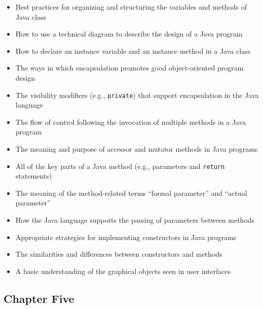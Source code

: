 \documentclass[11pt]{article}
\begin{document}
\begin{itemize}

  \itemsep 0in

  \item Best practices for organizing and structuring the variables and methods
    of Java class

  \item How to use a technical diagram to describe the design of a Java program

  \item How to declare an instance variable and an instance method in a Java
    class

  \item The ways in which encapsulation promotes good object-oriented program design

  \item The visibility modifiers (e.g., {\tt private}) that support
    encapsulation in the Java language

  \item The flow of control following the invocation of multiple methods in a
    Java program

  \item The meaning and purpose of accessor and mutator methods in Java programs

  \item All of the key parts of a Java method (e.g., parameters and {\tt return} statements)

  \item The meaning of the method-related terms ``formal parameter'' and ``actual parameter''

  \item How the Java language supports the passing of parameters between methods

  \item Appropriate strategies for implementing constructors in Java programs

  \item The similarities and differences between constructors and methods

  \item A basic understanding of the graphical objects seen in user interfaces

\end{itemize}

\subsection*{Chapter Five}
\end{document}
